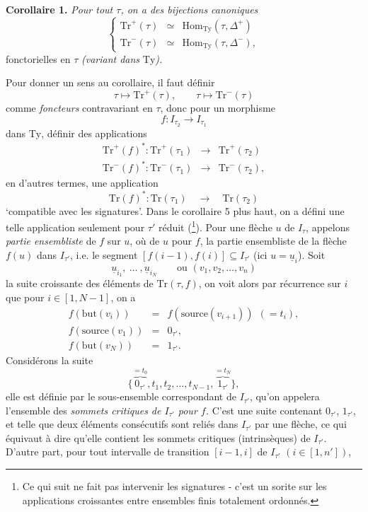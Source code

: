 \documentclass[11pt]{article}
\newcommand{\printedpage}[1]{\marginpar{\footnotesize p.~#1}}
\newcommand{\msp}[1]{\marginpar{\footnotesize [#1]}}
\newcommand{\Hom}{\mathrm{Hom}}
\newcommand{\Ty}{\mathrm{Ty}}
\newcommand{\Tr}{\mathrm{Tr}}
\begin{document}
\textbf{Corollaire 1.} \textit{Pour tout $\tau$, on a des bijections canoniques}
\[
\left\{
\begin{array}{lcl}
\Tr^+(\tau) & \simeq & \Hom_{\Ty}(\tau, \Delta^+) \\
\Tr^-(\tau) & \simeq & \Hom_{\Ty}(\tau, \Delta^-),
\end{array}
\right.
\]
fonctorielles en $\tau$ \textit{(variant dans} $\Ty$\textit{).}

\printedpage{26}

Pour donner un sens au corollaire, il faut définir
\[
\tau \longmapsto \Tr^+(\tau), \qquad \tau \longmapsto \Tr^-(\tau)
\]
comme \textit{foncteurs} contravariant en $\tau$, donc pour un morphisme
\[
f : I_{\tau_2} \longrightarrow I_{\tau_1}
\]
dans $\Ty$, définir des applications
\msp{page 41}
\[
\begin{array}{rcl}
\Tr^+(f)^* : \Tr^+(\tau_1) & \longrightarrow & \Tr^+(\tau_2) \\
\Tr^-(f)^* : \Tr^-(\tau_1) & \longrightarrow & \Tr^-(\tau_2),
\end{array}
\]
en d'autres termes, une application
\[
\Tr(f)^* : \Tr(\tau_1) \quad \longrightarrow \quad \Tr(\tau_2)
\]
‘compatible avec les signatures’. Dans le corollaire 5 plus haut, on a défini une telle application seulement pour $\tau'$ réduit (\footnote[12]{Ce qui suit ne fait pas intervenir les signatures - c'est un sorite sur les applications croissantes entre ensembles finis totalement ordonnés.}). Pour une flèche $u$ de $I_\tau$, appelons \textit{partie ensembliste} de $f$ sur $u$, où de $u$ pour $f$, la partie ensembliste de la flèche $f(u)$ dans $I_{\tau'}$, i.e. le segment $[f(i-1), f(i)] \subseteq I_{\tau'}$ (ici $u = \underline{u}_i$). Soit %
\[
\underline{u}_{i_1},\ \dots\ ,\underline{u}_{i_N} \qquad \text{ou } (v_1, v_2, \dots, v_n)
\] %
la suite croissante des éléments de $\Tr(\tau, f)$, on voit alors par récurrence sur $i$ que pour $i \in [1, N-1]$, on a
\[
\begin{array}{rcl}
f(\mathrm{but}(v_i)) & = & f(\mathrm{source}(v_{i+1}))\ \ (= t_i), \\
f(\mathrm{source}(v_1)) & = & 0_{\tau'}, \\
f(\mathrm{but}(v_N)) & = & 1_{\tau'}.
\end{array}
\]
Considérons la suite
\[
\{\overbrace{0_{\tau'}}^{= t_0}, t_1, t_2, \dots, t_{N-1}, \overbrace{1_{\tau'}}^{= t_N}\},
\]
elle est définie par le sous-ensemble correspondant de $I_{\tau'}$, qu'on appelera l'ensemble des \textit{sommets critiques de $I_{\tau'}$ pour $f$.} C'est une suite contenant $0_{\tau'}$, $1_{\tau'}$, et telle que deux éléments consécutifs sont reliés dans $I_{\tau'}$ par une flèche, ce qui équivaut à dire qu'elle contient les sommets critiques (intrinsèques) de $I_{\tau'}$. D'autre part, pour tout intervalle de transition $[i-1, i]$ de $I_{\tau'}$ $(i \in [1, n'])$, %
\end{document}
